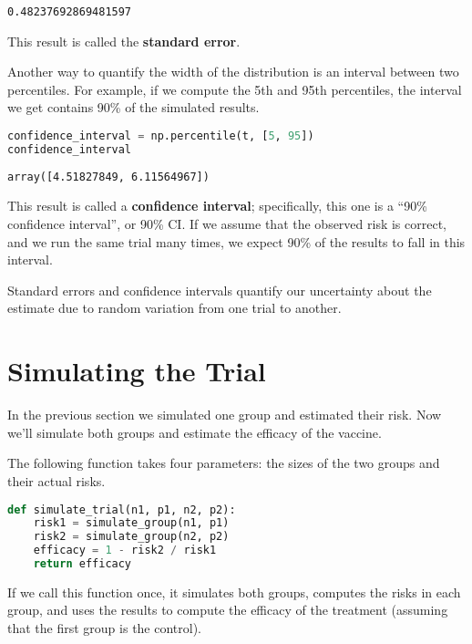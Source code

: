\begin{lstlisting}[style=output]
0.48237692869481597
\end{lstlisting}

This result is called the \textbf{standard error}.

Another way to quantify the width of the distribution is an interval
between two percentiles. For example, if we compute the 5th and 95th
percentiles, the interval we get contains 90\% of the simulated results.

\begin{lstlisting}[language=Python,style=source]
confidence_interval = np.percentile(t, [5, 95])
confidence_interval
\end{lstlisting}

\begin{lstlisting}[style=output]
array([4.51827849, 6.11564967])
\end{lstlisting}

This result is called a \textbf{confidence interval}; specifically, this
one is a ``90\% confidence interval'', or 90\% CI. If we assume that the
observed risk is correct, and we run the same trial many times, we
expect 90\% of the results to fall in this interval.

Standard errors and confidence intervals quantify our uncertainty about
the estimate due to random variation from one trial to another.

\section{Simulating the Trial}\label{simulating-the-trial}

In the previous section we simulated one group and estimated their risk.
Now we'll simulate both groups and estimate the efficacy of the vaccine.

The following function takes four parameters: the sizes of the two
groups and their actual risks.

\begin{lstlisting}[language=Python,style=source]
def simulate_trial(n1, p1, n2, p2):
    risk1 = simulate_group(n1, p1)
    risk2 = simulate_group(n2, p2)
    efficacy = 1 - risk2 / risk1
    return efficacy
\end{lstlisting}

If we call this function once, it simulates both groups, computes the
risks in each group, and uses the results to compute the efficacy of the
treatment (assuming that the first group is the control).

